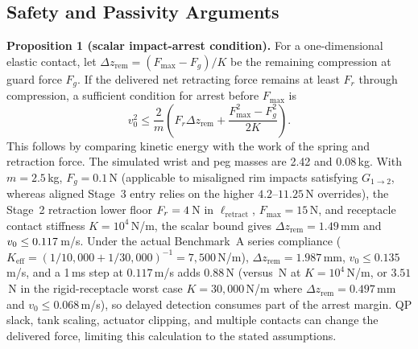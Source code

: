 \documentclass[letterpaper,10pt,conference]{IEEEtran}
\begin{document}
\subsection{Safety and Passivity Arguments}
\textbf{Proposition 1 (scalar impact-arrest condition).}
For a one-dimensional elastic contact, let $\Delta z_{\mathrm{rem}}=(F_{\max}-F_g)/K$ be the remaining compression at guard force $F_g$. If the delivered net retracting force remains at least $F_r$ through compression, a sufficient condition for arrest before $F_{\max}$ is
\begin{equation}
v_0^2 \le \frac{2}{m}\left(F_r\Delta z_{\mathrm{rem}}+\frac{F_{\max}^2-F_g^2}{2K}\right).
\end{equation}
This follows by comparing kinetic energy with the work of the spring and retraction force. The simulated wrist and peg masses are 2.42 and 0.08\,kg. With $m=2.5$\,kg, $F_g=0.1$\,N (applicable to misaligned rim impacts satisfying $G_{1\to 2}$, whereas aligned Stage~3 entry relies on the higher $4.2$--$11.25$\,N overrides), the Stage~2 retraction lower floor $F_r=4$\,N in $\ell_{\mathrm{retract}}$, $F_{\max}=15$\,N, and receptacle contact stiffness $K=10^4$\,N/m, the scalar bound gives $\Delta z_{\mathrm{rem}}=1.49$\,mm and $v_0\le0.117$\,m/s. Under the actual Benchmark~A series compliance ($K_{\mathrm{eff}}=(1/10{,}000+1/30{,}000)^{-1}=7{,}500$\,N/m), $\Delta z_{\mathrm{rem}}=1.987$\,mm, $v_0\le 0.135$\,m/s, and a 1\,ms step at $0.117$\,m/s adds $0.88$\,N (versus \SamplingForce\,N at $K=10^4$\,N/m, or $3.51$\,N in the rigid-receptacle worst case $K=30{,}000$\,N/m where $\Delta z_{\mathrm{rem}}=0.497$\,mm and $v_0\le 0.068$\,m/s), so delayed detection consumes part of the arrest margin. QP slack, tank scaling, actuator clipping, and multiple contacts can change the delivered force, limiting this calculation to the stated assumptions.
\end{document}

